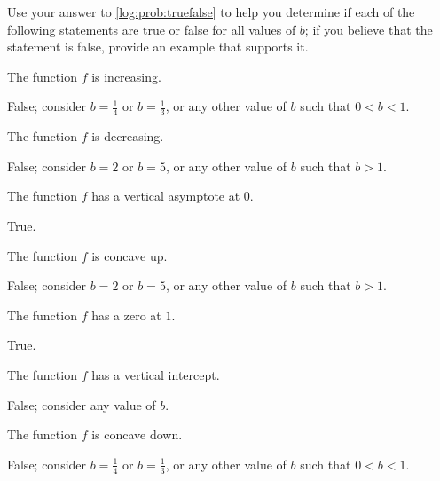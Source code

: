 \begin{problem}
\begin{subproblem}
\begin{shortsolution}
\begin{enumerate}
		\end{enumerate}
	\end{shortsolution}
\end{subproblem}
Use your answer to \cref{log:prob:truefalse} to help you determine if 
each of the following statements are true or false for all values of $b$; if you believe that 
the statement is false, provide an example that supports it.
\begin{subproblem}
	The function $f$ is increasing.  
	\begin{shortsolution}
		False; consider $b=\frac{1}{4}$ or $b=\frac{1}{3}$, or any other value of $b$ such that $0<b<1$.
	\end{shortsolution}
\end{subproblem}
\begin{subproblem}
	The function $f$ is decreasing. 
	\begin{shortsolution}
		False; consider $b=2$ or $b=5$, or any other value of $b$ such that $b>1$.
	\end{shortsolution}
\end{subproblem}
\begin{subproblem}
	The function $f$ has a vertical asymptote at $0$. 
	\begin{shortsolution}
		True.
	\end{shortsolution}
\end{subproblem}
\begin{subproblem}
	The function $f$ is concave up.     
	\begin{shortsolution}
		False; consider $b=2$ or $b=5$, or any other value of $b$ such that $b>1$.
	\end{shortsolution}
\end{subproblem}
\begin{subproblem}
	The function $f$ has a zero at $1$. 
	\begin{shortsolution}
		True. 
	\end{shortsolution}
\end{subproblem}
\begin{subproblem}
	The function $f$ has a vertical intercept. 
	\begin{shortsolution}
		False; consider any value of $b$. 
	\end{shortsolution}
\end{subproblem}
\begin{subproblem}
	The function $f$ is concave down. 
	\begin{shortsolution}
		False; consider $b=\frac{1}{4}$ or $b=\frac{1}{3}$, or any other value of $b$ such that $0<b<1$.
	\end{shortsolution}
\end{subproblem}
\end{problem}

